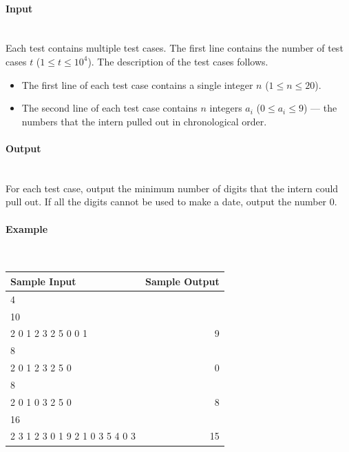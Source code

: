 \documentclass{article}
\begin{document}
\paragraph{Input} \mbox{} \\

Each test contains multiple test cases. The first line contains the number of test cases $t$ ($1 \leq t \leq 10^4$). The description of the test cases follows.

\begin{itemize}[leftmargin=*]
    \item The first line of each test case contains a single integer $n$ ($1 \leq n \leq 20$).
    \item The second line of each test case contains $n$ integers $a_i$ ($0 \leq a_i \leq 9$) — the numbers that the intern pulled out in chronological order.
\end{itemize}

\paragraph{Output}\mbox{} \\
For each test case, output the minimum number of digits that the intern could pull out. If all the digits cannot be used to make a date, output the number 0.


\paragraph{Example}\mbox{} \\

\begin{table}[h]
    \centering
    \begin{tabular}{|l|r|}
        \hline
        \textbf{Sample Input} & \textbf{Sample Output} \\
        \hline
        4 & \\
        10 & \\
        2 0 1 2 3 2 5 0 0 1 & 9 \\
        8 & \\
        2 0 1 2 3 2 5 0 & 0 \\
        8 & \\
        2 0 1 0 3 2 5 0 & 8 \\
        16 & \\
        2 3 1 2 3 0 1 9 2 1 0 3 5 4 0 3 & 15 \\
        \hline
    \end{tabular}
\end{table}
\end{document}
